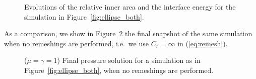 \documentclass[a4paper,12pt,onecolumn]{article}
\begin{document}
\begin{figure}[htbp]
\centering
{}
\caption{Evolutions of the relative inner area and the interface energy for
the simulation in Figure~\ref{fig:ellipse_both}.}
\label{fig:ellipse_both_volumes}
\end{figure}
As a comparison, we show in Figure~\ref{fig:ellipse_smooth} the final snapshot
of the same simulation when no remeshings are performed, i.e.\ we use $C_r=
\infty$ in (\ref{eq:remesh}).
\begin{figure}[htbp]
\centering
{}
\caption{($\mu=\gamma=1$) Final pressure solution for a simulation as in
Figure~\ref{fig:ellipse_both}, when no remeshings are performed.}
\label{fig:ellipse_smooth}
\end{figure}
\end{document}
